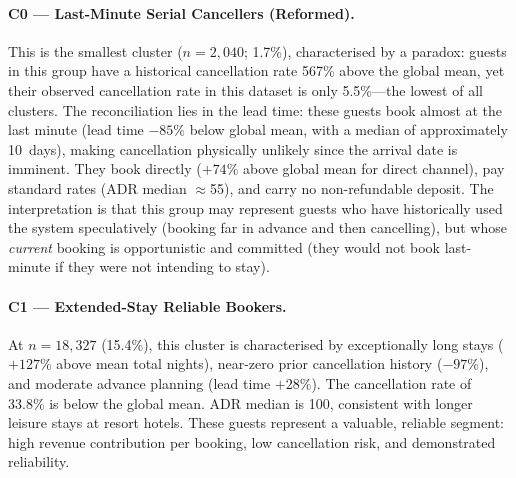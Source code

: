 \documentclass[12pt,a4paper]{article}
\begin{document}
\paragraph{C0 --- Last-Minute Serial Cancellers (Reformed).}
This is the smallest cluster ($n=2{,}040$; 1.7\%), characterised by a
paradox: guests in this group have a historical cancellation rate 567\%
above the global mean, yet their observed cancellation rate in this dataset
is only 5.5\%---the lowest of all clusters.
The reconciliation lies in the lead time: these guests book almost at the
last minute (lead time $-85\%$ below global mean, with a median of
approximately 10~days), making cancellation physically unlikely since the
arrival date is imminent.
They book directly ($+74\%$ above global mean for direct channel), pay
standard rates (ADR median $\approx$\EUR{}55), and carry no non-refundable
deposit.
The interpretation is that this group may represent guests who have
historically used the system speculatively (booking far in advance and then
cancelling), but whose \emph{current} booking is opportunistic and
committed (they would not book last-minute if they were not intending to stay).

\paragraph{C1 --- Extended-Stay Reliable Bookers.}
At $n=18{,}327$ (15.4\%), this cluster is characterised by exceptionally long
stays ($+127\%$ above mean total nights), near-zero prior cancellation history
($-97\%$), and moderate advance planning (lead time $+28\%$).
The cancellation rate of 33.8\% is below the global mean.
ADR median is \EUR{}100, consistent with longer leisure stays at resort hotels.
These guests represent a valuable, reliable segment: high revenue contribution
per booking, low cancellation risk, and demonstrated reliability.
\end{document}

